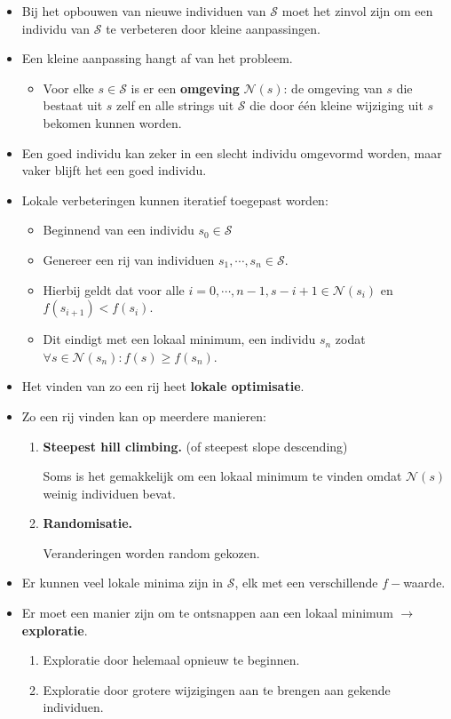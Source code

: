 \begin{itemize}
    \item Bij het opbouwen van nieuwe  individuen van $\mathcal{S}$ moet het zinvol zijn om een individu van $\mathcal{S}$ te verbeteren door kleine aanpassingen.
    \item Een kleine aanpassing hangt af van het probleem.
    \begin{itemize}
        \item Voor elke $s \in \mathcal{S}$ is er een \textbf{omgeving} $\mathcal{N}(s)$: de omgeving van $s$ die bestaat uit $s$ zelf en alle strings uit $\mathcal{S}$ die door één kleine wijziging uit $s$ bekomen kunnen worden.
    \end{itemize}  
    \item Een goed individu kan zeker in een slecht individu omgevormd worden, maar vaker blijft het een goed individu.
    \item Lokale verbeteringen kunnen iteratief toegepast worden:
    \begin{itemize}
        \item Beginnend van een individu $s_0 \in \mathcal{S}$
        \item Genereer een rij van individuen $s_1, \cdots , s_n \in \mathcal{S}$.
        \item Hierbij geldt dat voor alle $i = 0, \cdots, n-1, s-i+1 \in \mathcal{N}(s_i)$ en $f(s_{i + 1}) < f(s_i)$. 
        \item Dit eindigt met een lokaal minimum, een individu $s_n$ zodat $\forall s \in \mathcal{N}(s_n): f(s) \geq f(s_n)$.
    \end{itemize}
    \item Het vinden van zo een rij heet \textbf{lokale optimisatie}.
    \item Zo een rij vinden kan op meerdere manieren:
    \begin{enumerate}
        \item \textbf{Steepest hill climbing.} (of steepest slope descending)

        Soms is het gemakkelijk om een lokaal minimum te vinden omdat $\mathcal{N}(s)$ weinig individuen bevat.

        \item \textbf{Randomisatie.}

        Veranderingen worden random gekozen.
    \end{enumerate}

    \item Er kunnen veel lokale minima zijn in $\mathcal{S}$, elk met een verschillende $f-$waarde.
    \item Er moet een manier zijn om te ontsnappen aan een lokaal minimum $\rightarrow$ \textbf{exploratie}.
    \begin{enumerate}
        \item Exploratie door helemaal opnieuw te beginnen.
        \item Exploratie door grotere wijzigingen aan te brengen aan gekende individuen.
    \end{enumerate}
\end{itemize}

